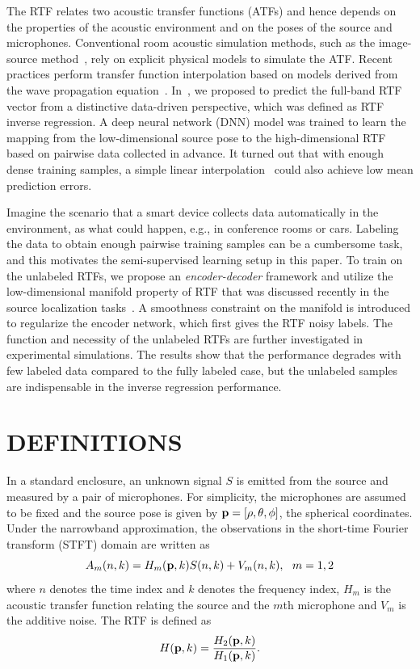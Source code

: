 \documentclass{article}
\begin{document}
The RTF relates two acoustic transfer functions (ATFs) and hence depends on the properties of the acoustic environment and on the poses of the source and microphones. Conventional room acoustic simulation methods, such as the image-source method~\cite{allen1979image}, rely on explicit physical models to simulate the ATF. Recent practices perform transfer function interpolation based on models derived from the wave propagation equation~\cite{samarasinghe2015efficient,mignot2014low}. In~\cite{rtfinv2017}, we proposed to predict the full-band RTF vector from a distinctive data-driven perspective, which was defined as RTF inverse regression. A deep neural network (DNN) model was trained to learn the mapping from the low-dimensional source pose to the high-dimensional RTF based on pairwise data collected in advance. It turned out that with enough dense training samples, a simple linear interpolation~\cite{vincent2013second} could also achieve low mean prediction errors.

Imagine the scenario that a smart device collects data automatically in the environment, as what could happen, e.g., in conference rooms or cars. Labeling the data to obtain enough pairwise training samples can be a cumbersome task, and this motivates the semi-supervised learning setup in this paper. To train on the unlabeled RTFs, we propose an \emph{encoder-decoder} framework and utilize the low-dimensional manifold property of RTF that was discussed recently in the source localization tasks~\cite{deleforge20122d,laufer2013relative,deleforge2015acoustic,laufer2016mr}. A smoothness constraint on the manifold is introduced to regularize the encoder network, which first gives the RTF noisy labels. The function and necessity of the unlabeled RTFs are further investigated in experimental simulations. The results show that the performance degrades with few labeled data compared to the fully labeled case, but the unlabeled samples are indispensable in the inverse regression performance.

\section{DEFINITIONS}
\label{sec:defs}

In a standard enclosure, an unknown signal $S$ is emitted from the source and measured by a pair of microphones. For simplicity, the microphones are assumed to be fixed and the source pose is given by ${\bf p}=[\rho,\theta,\phi]$, the spherical coordinates. Under the narrowband approximation, the observations in the short-time Fourier transform (STFT) domain are written as
\begin{equation}\label{eq:sigfreq}
  A_m(n,k) = H_m({\bf p},k)S(n,k) + V_m(n,k), ~~m=1,2
\end{equation}
where $n$ denotes the time index and $k$ denotes the frequency index, $H_m$ is the acoustic transfer function relating the source and the $m$th microphone and $V_m$ is the additive noise. The RTF is defined as
\begin{equation}\label{eq:rtf}
  H({\bf p}, k) = \frac{H_2({\bf p}, k)}{H_1({\bf p}, k)}.
\end{equation}
\end{document}
